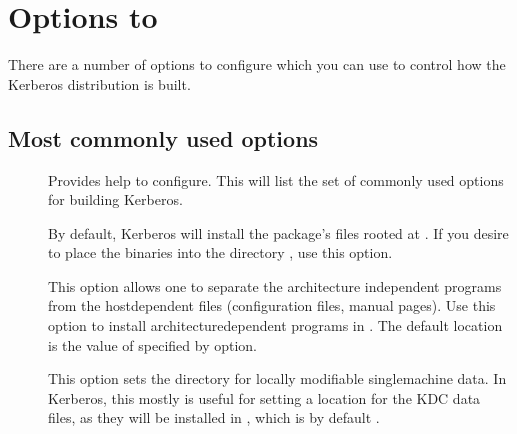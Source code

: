 \documentclass[letterpaper,10pt,english]{sphinxmanual}
\begin{document}
\section{Options to }
\label{\detokenize{build/options2configure:options-to-configure}}\label{\detokenize{build/options2configure:options2configure}}\label{\detokenize{build/options2configure::doc}}
\sphinxAtStartPar
There are a number of options to configure which you can use to
control how the Kerberos distribution is built.


\subsection{Most commonly used options}
\label{\detokenize{build/options2configure:most-commonly-used-options}}\begin{description}
\item[{\sphinxstylestrong{\sphinxhyphen{}}}] \leavevmode
\sphinxAtStartPar
Provides help to configure.  This will list the set of commonly
used options for building Kerberos.

\item[{\sphinxstylestrong{\sphinxhyphen{}}}] \leavevmode
\sphinxAtStartPar
By default, Kerberos will install the package’s files rooted at
.  If you desire to place the binaries into the
directory , use this option.

\item[{\sphinxstylestrong{\sphinxhyphen{}}}] \leavevmode
\sphinxAtStartPar
This option allows one to separate the architecture independent
programs from the host\sphinxhyphen{}dependent files (configuration files,
manual pages).  Use this option to install architecture\sphinxhyphen{}dependent
programs in .  The default location is the value of
specified by \sphinxstylestrong{\sphinxhyphen{}} option.

\item[{\sphinxstylestrong{\sphinxhyphen{}}}] \leavevmode
\sphinxAtStartPar
This option sets the directory for locally modifiable
single\sphinxhyphen{}machine data.  In Kerberos, this mostly is useful for
setting a location for the KDC data files, as they will be
installed in , which is by default
.


\end{description}
\end{document}
